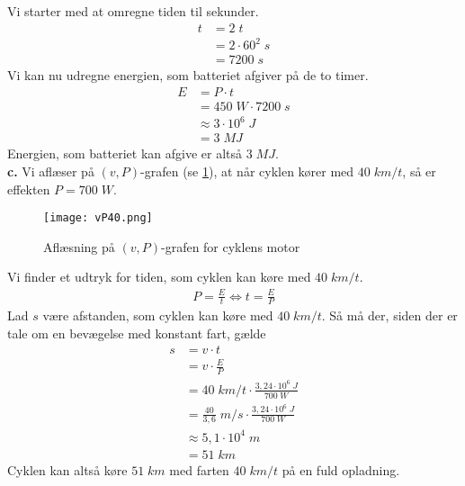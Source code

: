 \documentclass{report}
\begin{document}
Vi starter med at omregne tiden til sekunder.
\begin{equation*}
\begin{split}
  t&=2 \;\unit{t} \\
  &=2 \cdot 60^2 \;\unit{s} \\
  &=7200 \;\unit{s} 
\end{split}
\end{equation*}
Vi kan nu udregne energien, som batteriet afgiver på de to timer.
\begin{equation*}
\begin{split}
  E&=P \cdot t \\
  &=450 \;\unit{W} \cdot 7200 \;\unit{s} \\
  &\approx 3 \cdot 10 ^{6}\;\unit{J} \\
  &=3 \;\unit{MJ} 
\end{split}
\end{equation*}
Energien, som batteriet kan afgive er altså $3 \;\unit{MJ} $. \\[1ex]
\textbf{c.}
Vi aflæser på $(v,P)$-grafen (se \cref{fig:vP40}), at når cyklen kører med $40 \;\unit{km/t} $, så er effekten $P=700 \;\unit{W} $.
\begin{figure}[H]
\begin{center}
  \texttt{[image: vP40.png]}
\end{center}
  \caption{Aflæsning på $(v,P)$-grafen for cyklens motor}
\label{fig:vP40}
\end{figure}
Vi finder et udtryk for tiden, som cyklen kan køre med $40 \;\unit{km/t} $.
\begin{equation*}
\begin{split}
  P=\frac{E}{t} \iff t=\frac{E}{P}
\end{split}
\end{equation*}
Lad $s$ være afstanden, som cyklen kan køre med $40 \;\unit{km/t} $.
Så må der, siden der er tale om en bevægelse med konstant fart, gælde
\begin{equation*}
\begin{split}
  s&=v \cdot t \\
  &=v \cdot \frac{E}{P}\\
  &=40 \;\unit{km/t} \cdot \frac{3,24 \cdot 10 ^{6}\;\unit{J} }{700 \;\unit{W} }\\
  &=\frac{40}{3,6} \;\unit{m/s} \cdot \frac{3,24 \cdot 10 ^{6}\;\unit{J} }{700 \;\unit{W} }\\
  &\approx 5,1 \cdot 10^4 \;\unit{m} \\
  &=51 \;\unit{km} 
\end{split}
\end{equation*}
Cyklen kan altså køre $51 \;\unit{km} $ med farten $40 \;\unit{km/t} $ på en fuld opladning. 
\end{document}
